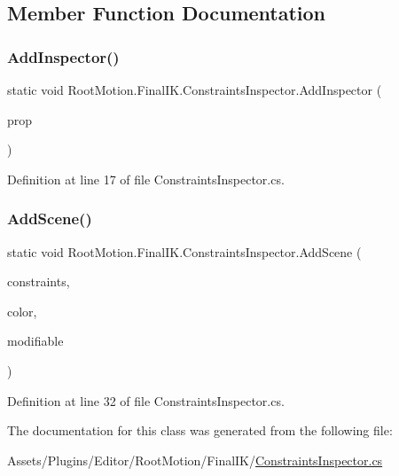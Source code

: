 \subsection{Member Function Documentation}
\mbox{\label{class_root_motion_1_1_final_i_k_1_1_constraints_inspector_a02d18a1e6cf7fb0e15afa40aea3482f2}} 
\subsubsection{\texorpdfstring{Add\+Inspector()}{AddInspector()}}
{\footnotesize\ttfamily static void Root\+Motion.\+Final\+I\+K.\+Constraints\+Inspector.\+Add\+Inspector (\begin{DoxyParamCaption}\item[{Serialized\+Property}]{prop }\end{DoxyParamCaption})\hspace{0.3cm}{\ttfamily [static]}}



Definition at line 17 of file Constraints\+Inspector.\+cs.

\mbox{\label{class_root_motion_1_1_final_i_k_1_1_constraints_inspector_a5da94528055b76f988008e744a1b3ea4}} 
\subsubsection{\texorpdfstring{Add\+Scene()}{AddScene()}}
{\footnotesize\ttfamily static void Root\+Motion.\+Final\+I\+K.\+Constraints\+Inspector.\+Add\+Scene (\begin{DoxyParamCaption}\item[{Constraints}]{constraints,  }\item[{Color}]{color,  }\item[{bool}]{modifiable }\end{DoxyParamCaption})\hspace{0.3cm}{\ttfamily [static]}}



Definition at line 32 of file Constraints\+Inspector.\+cs.



The documentation for this class was generated from the following file\+:\begin{DoxyCompactItemize}
\item 
Assets/\+Plugins/\+Editor/\+Root\+Motion/\+Final\+I\+K/\mbox{\hyperlink{_constraints_inspector_8cs}{Constraints\+Inspector.\+cs}}\end{DoxyCompactItemize}
